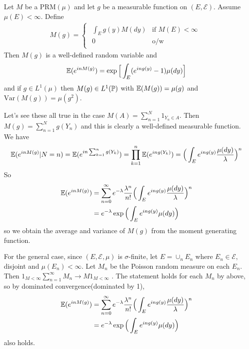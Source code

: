 \documentclass[12pt,a4paper]{report}
\newenvironment{proof}
{\begin{changemargin}{1cm}{0.5cm} 
	}%
	{\end{changemargin}
}
\begin{document}
 Let $M$ be a $\text{PRM}(\mu)$ and let $g$ be a measurable function on $(E, \mathscr{E})$. Assume $\mu(E) < \infty$. Define
\begin{align*}
M(g) = \begin{cases}
\begin{array}{ll}
\int_E g(y) M(dy) & \text{if  } M(E) < \infty \\
0 & \text{o/w}
\end{array}
\end{cases}
\end{align*}
Then $M(g)$ is a well-defined random variable and 
\begin{align*}
\mathbb{E}(e^{inM(g)}) = \exp \Big[ \int_E (e^{ing(y)} -1) \mu(dy) \Big]
\end{align*}
and if $g\in L^1(\mu)$ then $M(g) \in L^1(\mathbb{P})$ with $\mathbb{E}(M(g)) = \mu(g)$ and $\text{Var}(M(g)) = \mu(g^2)$.
\begin{proof}
\pf Let's see these all true in the case $M(A) = \sum_{n=1}^N 1_{Y_n \in A}$. Then $M(g) = \sum_{n=1}^N g(Y_n)$ and this is clearly a well-defined measurable function. We have
\begin{align*}
\mathbb{E}(e^{in M(g)} | N=n) = \mathbb{E}( e^{in \sum_{k=1}^n g(Y_k) }) =\prod_{k=1}^n \mathbb{E}( e^{in  g(Y_k) }) = \Big( \int_E e^{in g(y)} \frac{\mu(dy)}{\lambda} \Big)^n
\end{align*}
So 
\begin{align*}
\mathbb{E}(e^{in M(g)}) &= \sum_{n=0}^{\infty} e^{-\lambda} \frac{\lambda^n}{n!} \Big( \int_E e^{ing(y)} \frac{\mu(dy)}{\lambda} \Big)^n \\
&= e^{-\lambda} \exp \Big( \int_E e^{ing(y)} \mu(dy) \Big)
\end{align*}
so we obtain the average and variance of $M(g)$ from the moment generating function.

\quad For the general case, since $(E, \mathscr{E},\mu)$ is $\sigma$-finite, let $E = \cup_n E_n$ where $E_n \in \mathscr{E}$, disjoint and $\mu(E_n) < \infty$. Let $M_n$ be the Poisson random measure on each $E_n$. Then $1_{M<\infty} \sum_{n=1}^{\infty} M_{n} \rightarrow M 1_{M<\infty}$ . The statement holds for each $M_n$ by above, so by dominated convergence(dominated by 1),
\begin{align*}
\mathbb{E}(e^{in M(g)}) &= \sum_{n=0}^{\infty} e^{-\lambda} \frac{\lambda^n}{n!} \Big( \int_E e^{ing(y)} \frac{\mu(dy)}{\lambda} \Big)^n \\
&= e^{-\lambda} \exp \Big( \int_E e^{ing(y)} \mu(dy) \Big)
\end{align*}
also holds.

\eop
\end{proof}
\end{document}
